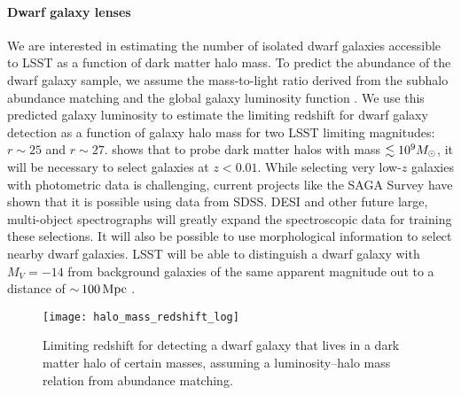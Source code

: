 \paragraph{Dwarf galaxy lenses}
We are interested in estimating the number of isolated dwarf galaxies accessible to LSST as a function of dark matter halo mass.
To predict the abundance of the dwarf  galaxy sample, we assume the mass-to-light ratio derived from the subhalo abundance matching and the global galaxy luminosity function
 \citep{2015MNRAS.451.1540L}.
We use this predicted galaxy luminosity to estimate the limiting redshift for dwarf galaxy detection as a function of galaxy halo mass for two LSST limiting magnitudes: $r \sim 25$ and $r \sim 27$. 
 shows that to probe dark matter halos with mass $\lesssim 10^9 M_\odot$, it will be necessary to select galaxies at $z < 0.01$. 
While selecting very low-$z$ galaxies with photometric data is challenging, current projects like the SAGA Survey \citep{Geha:2017} have shown that it is possible using data from SDSS. 
DESI and other  future large, multi-object spectrographs will greatly expand the spectroscopic data for training these selections. 
It will also be possible to use morphological information to select nearby dwarf galaxies.
LSST will be able to distinguish a dwarf galaxy with $M_V=-14$ from background galaxies of the same apparent magnitude out to a distance of $ {\sim}\, 100 \mathrm{\,Mpc}$ \citep[Section 9 of][]{0912.0201}.

\begin{figure}
\centering
\texttt{[image: halo\_mass\_redshift\_log]}
\caption{\label{fig:dwarf_redshift} Limiting redshift for detecting a dwarf galaxy that lives in a dark matter halo of certain masses, assuming a luminosity--halo mass relation from abundance matching.}
\end{figure}



